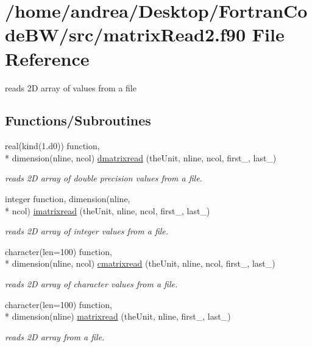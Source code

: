 \hypertarget{matrix_read2_8f90}{\section{/home/andrea/\-Desktop/\-Fortran\-Code\-B\-W/src/matrix\-Read2.f90 File Reference}
\label{matrix_read2_8f90}
}


reads 2\-D array of values from a file  


\subsection*{Functions/\-Subroutines}
\begin{DoxyCompactItemize}
\item 
real(kind(1.d0)) function, \\*
dimension(nline, ncol) \hyperlink{matrix_read2_8f90_a2a8cd6e54d2e10751ce52e8a50091191}{dmatrixread} (the\-Unit, nline, ncol, first\-\_\-, last\-\_\-)
\begin{DoxyCompactList}\small\item\em reads 2\-D array of double precision values from a file. \end{DoxyCompactList}\item 
integer function, dimension(nline, \\*
ncol) \hyperlink{matrix_read2_8f90_a9bbb90a3f70ad54afe3a0c51af1396d7}{imatrixread} (the\-Unit, nline, ncol, first\-\_\-, last\-\_\-)
\begin{DoxyCompactList}\small\item\em reads 2\-D array of integer values from a file. \end{DoxyCompactList}\item 
character(len=100) function, \\*
dimension(nline, ncol) \hyperlink{matrix_read2_8f90_abf64de424b7c068365381697e8ec0207}{cmatrixread} (the\-Unit, nline, ncol, first\-\_\-, last\-\_\-)
\begin{DoxyCompactList}\small\item\em reads 2\-D array of character values from a file. \end{DoxyCompactList}\item 
character(len=100) function, \\*
dimension(nline) \hyperlink{matrix_read2_8f90_ab6e07303536c022a24a5c1d0caffc9e4}{matrixread} (the\-Unit, nline, first\-\_\-, last\-\_\-)
\begin{DoxyCompactList}\small\item\em reads 2\-D array from a file. \end{DoxyCompactList}\end{DoxyCompactItemize}


